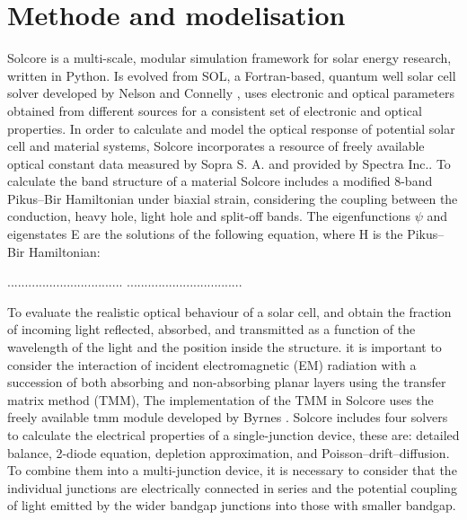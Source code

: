 \documentclass[preprint,12pt]{elsarticle}
\begin{document}
\section{Methode and modelisation} \label{sec:Methode and modelisation}

Solcore is a multi-scale, modular simulation framework for solar energy research, written in Python. Is evolved from SOL, a Fortran-based, quantum well solar cell solver developed by Nelson and Connelly \cite{book1}, uses electronic and optical parameters obtained from different sources for a consistent set of electronic and optical properties. In order to calculate and model the optical response of potential solar cell and material systems, Solcore incorporates a resource of freely available optical constant data measured by Sopra S. A. and provided by Spectra Inc.\cite{sopra2008optical}. To calculate the band structure of a material Solcore includes a modified 8-band Pikus–Bir Hamiltonian under biaxial strain, considering the coupling between the conduction, heavy hole, light hole and split-off bands. The eigenfunctions $\psi$ and eigenstates E are the solutions of the following equation, where H is the Pikus–Bir Hamiltonian:

.................................
.................................

To evaluate the realistic optical behaviour of a solar cell, and obtain the fraction of incoming light reflected, absorbed, and transmitted as a function of the wavelength of the light and the position inside the structure. it is important to consider the interaction of incident electromagnetic (EM) radiation with a succession of both absorbing and non-absorbing planar layers using the  transfer matrix method (TMM), The implementation of the TMM in Solcore uses the freely available tmm module developed by Byrnes \cite{byrnes2016multilayer}. Solcore includes four solvers to calculate the electrical properties of a single-junction device, these are: detailed balance, 2-diode equation, depletion approximation, and Poisson–drift–diffusion. To combine them into a multi-junction device, it is necessary
to consider that the individual junctions are electrically connected in series and the potential coupling of light emitted by the wider bandgap junctions into those with smaller bandgap.
\end{document}
